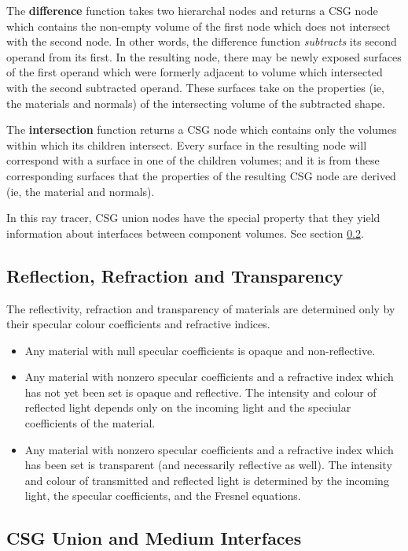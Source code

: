 \documentclass{article}
\begin{document}
The {\bf difference} function takes two hierarchal nodes and returns a CSG node which
contains the non-empty volume of the first node which does not intersect with
the second node. In other words, the difference function \emph{subtracts} its
second operand from its first. In the resulting node, there may be newly exposed
surfaces of the first operand which were formerly adjacent to volume which
intersected with the second subtracted operand. These surfaces take on the
properties (ie, the materials and normals) of the intersecting volume of the
subtracted shape.

The {\bf intersection} function returns a CSG node which contains only the volumes
within which its children intersect. Every surface in the resulting node will
correspond with a surface in one of the children volumes; and it is from these
corresponding surfaces that the properties of the resulting CSG node are derived
(ie, the material and normals).

In this ray tracer, CSG union nodes have the special property that they yield
information about interfaces between component volumes. See section
\ref{csg_union}.

\subsection{Reflection, Refraction and Transparency}
\label{rrt}

The reflectivity, refraction and transparency of materials are determined only by
their specular colour coefficients and refractive indices.

\begin{itemize}
  \item Any material with null specular coefficients is opaque and non-reflective.
  \item Any material with nonzero specular coefficients and a refractive index
    which has not yet been set is opaque and reflective. The intensity and
    colour of reflected light depends only on the incoming light and the
    speciular coefficients of the material.
  \item Any material with nonzero specular coefficients and a refractive index
    which has been set is transparent (and necessarily reflective as well). The
    intensity and colour of transmitted and reflected light is determined by the
    incoming light, the specular coefficients, and the Fresnel equations.
\end{itemize}

\subsection{CSG Union and Medium Interfaces}
\label{csg_union}
\end{document}
